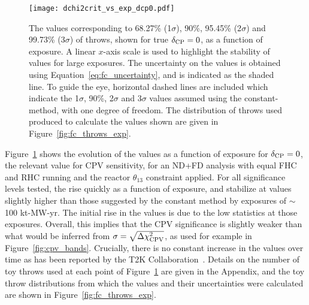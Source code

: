 \begin{figure}[htbp]
  \centering
  \texttt{[image: dchi2crit\_vs\_exp\_dcp0.pdf]}
  \caption{The \dchisqcrit values corresponding to 68.27\% (1$\sigma$), 90\%, 95.45\% (2$\sigma$) and 99.73\% (3$\sigma$) of throws, shown for true $\delta_{\rm CP} = 0$, as a function of exposure. A linear $x$-axis scale is used to highlight the stability of \dchisqcrit values for large exposures. The uncertainty on the \dchisqcrit values is obtained using Equation~\ref{eq:fc_uncertainty}, and is indicated as the shaded line. To guide the eye, horizontal dashed lines are included which indicate the 1$\sigma$, 90\%, 2$\sigma$ and 3$\sigma$ \dchisq values assumed using the constant-\dchisq method, with one degree of freedom. The distribution of throws used produced to calculate the \dchisqcrit values shown are given in Figure~\ref{fig:fc_throws_exp}.}
  \label{fig:fc_vs_exp}
\end{figure}
Figure~\ref{fig:fc_vs_exp} shows the evolution of the \dchisqcrit values as a function of exposure for $\delta_{\rm CP} = 0$, the relevant value for CPV sensitivity, for an ND+FD analysis with equal FHC and RHC running and the reactor $\theta_{13}$ constraint applied.
For all significance levels tested, the \dchisqcrit rise quickly as a function of exposure, and stabilize at values slightly higher than those suggested by the constant \dchisq method by exposures of $\sim$100 kt-MW-yr. The initial rise in the \dchisqcrit values is due to the low statistics at those exposures. Overall, this implies that the CPV significance is slightly weaker than what would be inferred from $\sigma = \sqrt{\Delta\chi^{2}_{\mathrm{CPV}}}$, as used for example in Figure~\ref{fig:cpv_bands}. Crucially, there is no constant increase in the \dchisqcrit values over time as has been reported by the T2K Collaboration~\cite{Abe:2021gky}. Details on the number of toy throws used at each point of Figure~\ref{fig:fc_vs_exp} are given in the Appendix, and the toy throw distributions from which the \dchisqcrit values and their uncertainties were calculated are shown in Figure~\ref{fig:fc_throws_exp}.

